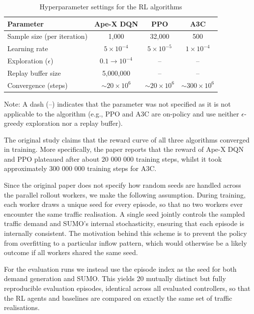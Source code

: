 \begin{table}[H]
    \centering
    \caption{Hyperparameter settings for the RL algorithms}
    \label{tab:rl_parameters}
    \begin{tabular}{@{}lccc@{}}
    \toprule
    \textbf{Parameter} & \textbf{Ape-X DQN} & \textbf{PPO} & \textbf{A3C} \\ \midrule
    Sample size (per iteration) & 1,000 & 32,000 & 500 \\
    Learning rate & $5 \times 10^{-4}$ & $5 \times 10^{-5}$ & $1 \times 10^{-4}$ \\
    Exploration ($\epsilon$) & $0.1 \to 10^{-4}$ & -- & -- \\
    Replay buffer size & 5,000,000 & -- & -- \\
    Convergence (steps) & $\sim 20 \times 10^6$ & $\sim 20 \times 10^6$ & $\sim 300 \times 10^6$ \\ \bottomrule
    \end{tabular}

    \vspace{0.5em}
    \begin{minipage}{0.95\linewidth}
    \small Note: A dash (--) indicates that the parameter was not specified as it is not applicable to the algorithm (e.g., PPO and A3C are on-policy and use neither $\epsilon$-greedy exploration nor a replay buffer).
    \end{minipage}
\end{table}


The original study claims that the reward curve of all three algorithms converged in training. More specifically, the paper reports that the reward of Ape-X DQN and PPO plateaued after about 20 000 000 training steps, whilst it took approximately 300 000 000 training steps for A3C.

Since the original paper does not specify how random seeds are handled across the parallel rollout workers, we make the following assumption. During training, each worker draws a unique seed for every episode, so that no two workers ever encounter the same traffic realisation. A single seed jointly controls the sampled traffic demand and SUMO's internal stochasticity, ensuring that each episode is internally consistent. The motivation behind this scheme is to prevent the policy from overfitting to a particular inflow pattern, which would otherwise be a likely outcome if all workers shared the same seed.

For the evaluation runs we instead use the episode index as the seed for both demand generation and SUMO. This yields 20 mutually distinct but fully reproducible evaluation episodes, identical across all evaluated controllers, so that the RL agents and baselines are compared on exactly the same set of traffic realisations.
